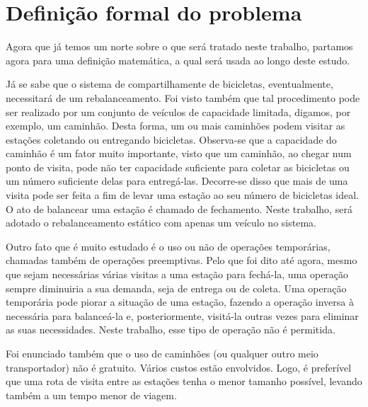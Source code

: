 \section{Definição formal do problema}\label{sec:LABEL_CHP_1_SEC_A}
Agora que já temos um norte sobre o que será tratado neste trabalho, partamos agora para uma definição matemática, a qual será usada ao longo deste estudo. \par Já se sabe que o sistema de compartilhamente de bicicletas, eventualmente, necessitará de um rebalanceamento. Foi visto também que tal procedimento pode ser realizado por um conjunto de veículos de capacidade limitada, digamos, por exemplo, um caminhão. Desta forma, um ou mais caminhões podem visitar as estações coletando ou entregando bicicletas. Observa-se que a capacidade do caminhão é um fator muito importante, visto que um caminhão, ao chegar num ponto de visita, pode não ter capacidade suficiente para coletar as bicicletas ou um número suficiente delas para entregá-las. Decorre-se disso que mais de uma visita pode ser feita a fim de levar uma estação ao seu número de bicicletas ideal. O ato de balancear uma estação é chamado de fechamento. Neste trabalho, será adotado o rebalanceamento estático com apenas um veículo no sistema. \par Outro fato que é muito estudado é o uso ou não de operações temporárias, chamadas também de operações preemptivas. Pelo que foi dito até agora, mesmo que sejam necessárias várias visitas a uma estação para fechá-la, uma operação sempre diminuiria a sua demanda, seja de entrega ou de coleta. Uma operação temporária pode piorar a situação de uma estação, fazendo a operação inversa à necessária para balanceá-la e, posteriormente, visitá-la outras vezes para eliminar as suas necessidades. Neste trabalho, esse tipo de operação não é permitida. \par Foi enunciado também que o uso de caminhões (ou qualquer outro meio transportador) não é gratuito. Vários custos estão envolvidos. Logo, é preferível que uma rota de visita entre as estações tenha o menor tamanho possível, levando também a um tempo menor de viagem.

